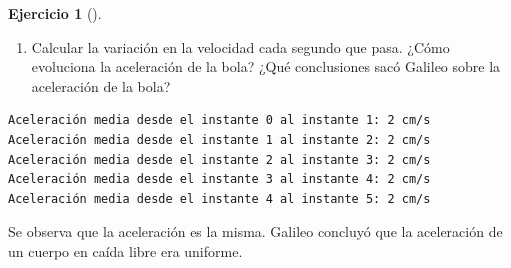 \documentclass[
  a4paper,
]{scrreport}
\newenvironment{Shaded}{\begin{snugshade}}{\end{snugshade}}
\newcommand{\ControlFlowTok}[1]{\textcolor[rgb]{0.00,0.23,0.31}{#1}}
\newcommand{\FloatTok}[1]{\textcolor[rgb]{0.68,0.00,0.00}{#1}}
\newcommand{\FunctionTok}[1]{\textcolor[rgb]{0.28,0.35,0.67}{#1}}
\newcommand{\KeywordTok}[1]{\textcolor[rgb]{0.00,0.23,0.31}{#1}}
\newcommand{\NormalTok}[1]{\textcolor[rgb]{0.00,0.23,0.31}{#1}}
\newcommand{\OperatorTok}[1]{\textcolor[rgb]{0.37,0.37,0.37}{#1}}
\newcommand{\SpecialCharTok}[1]{\textcolor[rgb]{0.37,0.37,0.37}{#1}}
\newcommand{\StringTok}[1]{\textcolor[rgb]{0.13,0.47,0.30}{#1}}
\providecommand{\tightlist}{%
  \setlength{\itemsep}{0pt}\setlength{\parskip}{0pt}}\usepackage{longtable,booktabs,array}
\theoremstyle{definition}
\newtheorem{exercise}{Ejercicio}[chapter]
\theoremstyle{remark}
\begin{document}
\begin{exercise}[]
\begin{tcolorbox}
\end{tcolorbox}

\begin{enumerate}
\def\labelenumi{\alph{enumi}.}
\setcounter{enumi}{4}
\tightlist
\item
  Calcular la variación en la velocidad cada segundo que pasa. ¿Cómo
  evoluciona la aceleración de la bola? ¿Qué conclusiones sacó Galileo
  sobre la aceleración de la bola?
\end{enumerate}

\begin{tcolorbox}[enhanced jigsaw, titlerule=0mm, colframe=quarto-callout-tip-color-frame, opacityback=0, colback=white, toprule=.15mm, breakable, arc=.35mm, title=\textcolor{quarto-callout-tip-color}{\faLightbulb}\hspace{0.5em}{Solución}, bottomtitle=1mm, toptitle=1mm, rightrule=.15mm, bottomrule=.15mm, opacitybacktitle=0.6, coltitle=black, leftrule=.75mm, left=2mm, colbacktitle=quarto-callout-tip-color!10!white]

\begin{Shaded}
\end{Shaded}

\begin{verbatim}
Aceleración media desde el instante 0 al instante 1: 2 cm/s
Aceleración media desde el instante 1 al instante 2: 2 cm/s
Aceleración media desde el instante 2 al instante 3: 2 cm/s
Aceleración media desde el instante 3 al instante 4: 2 cm/s
Aceleración media desde el instante 4 al instante 5: 2 cm/s
\end{verbatim}

Se observa que la aceleración es la misma. Galileo concluyó que la
aceleración de un cuerpo en caída libre era uniforme.

\end{tcolorbox}

\end{exercise}
\end{document}
